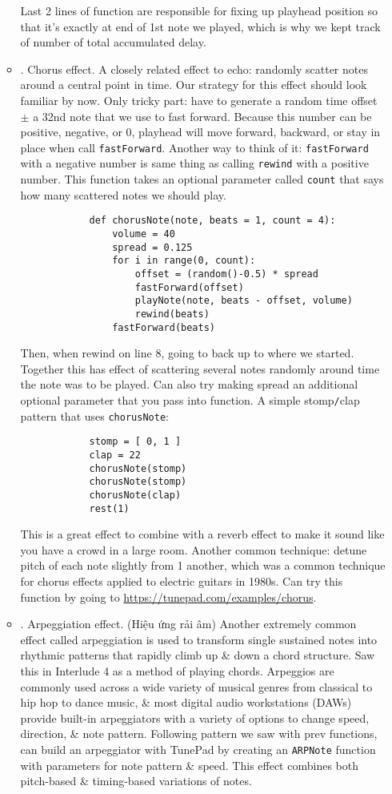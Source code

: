 \documentclass{article}
\begin{document}
\begin{itemize}
\begin{itemize}
		Last 2 lines of function are responsible for fixing up playhead position so that it's exactly at end of 1st note we played, which is why we kept track of number of total accumulated delay.
		\item {. Chorus effect.} A closely related effect to echo: randomly scatter notes around a central point in time. Our strategy for this effect should look familiar by now. Only tricky part: have to generate a random time offset $\pm$ a 32nd note that we use to fast forward. Because this number can be positive, negative, or 0, playhead will move forward, backward, or stay in place when call {\tt fastForward}. Another way to think of it: {\tt fastForward} with a negative number is same thing as calling {\tt rewind} with a positive number. This function takes an optional parameter called {\tt count} that says how many scattered notes we should play.
		\begin{verbatim}
			def chorusNote(note, beats = 1, count = 4):
			    volume = 40
			    spread = 0.125
			    for i in range(0, count):
			        offset = (random()-0.5) * spread
			        fastForward(offset)
			        playNote(note, beats - offset, volume)
			        rewind(beats)
			    fastForward(beats)
		\end{verbatim}
		Then, when rewind on line 8, going to back up to where we started. Together this has effect of scattering several notes randomly around time the note was to be played. Can also try making spread an additional optional parameter that you pass into function. A simple stomp{\tt/}clap pattern that uses {\tt chorusNote}:
		\begin{verbatim}
			stomp = [ 0, 1 ]
			clap = 22
			chorusNote(stomp)
			chorusNote(stomp)
			chorusNote(clap)
			rest(1)
		\end{verbatim}
		This is a great effect to combine with a reverb effect to make it sound like you have a crowd in a large room. Another common technique: detune pitch of each note slightly from 1 another, which was a common technique for chorus effects applied to electric guitars in 1980s. Can try this function by going to \url{https://tunepad.com/examples/chorus}.
		\item {. Arpeggiation effect.} (Hiệu ứng rải âm) Another extremely common effect called arpeggiation is used to transform single sustained notes into rhythmic patterns that rapidly climb up \& down a chord structure. Saw this in Interlude 4 as a method of playing chords. Arpeggios are commonly used across a wide variety of musical genres from classical to hip hop to dance music, \& most digital audio workstations (DAWs) provide built-in arpeggiators with a variety of options to change speed, direction, \& note pattern. Following pattern we saw with prev functions, can build an arpeggiator with TunePad by creating an {\tt ARPNote} function with parameters for note pattern \& speed. This effect combines both pitch-based \& timing-based variations of notes.

\end{itemize}
\end{itemize}
\end{document}

